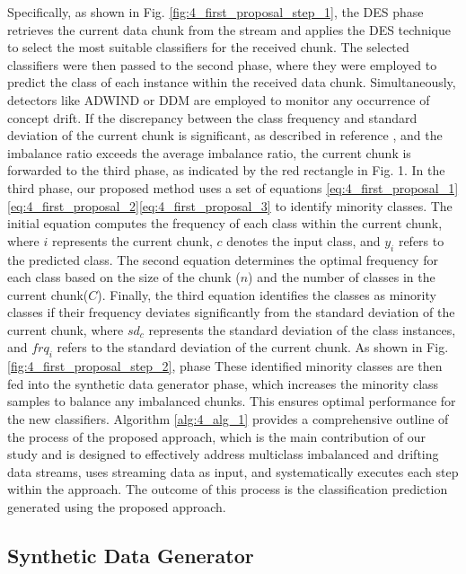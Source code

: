 Specifically, as shown in Fig. \ref{fig:4_first_proposal_step_1}, the DES phase retrieves the current data chunk from the stream and applies the DES technique to select the most suitable classifiers for the received chunk. The selected classifiers were then passed to the second phase, where they were employed to predict the class of each instance within the received data chunk. Simultaneously, detectors like ADWIND or DDM are employed to monitor any occurrence of concept drift. If the discrepancy between the class frequency and standard deviation of the current chunk is significant, as described in reference \cite{gama2004learning}, and the imbalance ratio exceeds the average imbalance ratio, the current chunk is forwarded to the third phase, as indicated by the red rectangle in Fig. 1. In the third phase, our proposed method uses a set of equations \ref{eq:4_first_proposal_1}\ref{eq:4_first_proposal_2}\ref{eq:4_first_proposal_3}
to identify minority classes. The initial equation computes the frequency of each class within the current chunk, where $i$ represents the current chunk, $c$ denotes the input class, and $y_i$ refers to the predicted class. The second equation determines the optimal frequency for each class based on the size of the chunk ($n$) and the number of classes in the current chunk($C$). Finally, the third equation identifies the classes as minority classes if their frequency deviates significantly from the standard deviation of the current chunk, where $sd_c$ represents the standard deviation of the class instances, and $frq_i$ refers to the standard deviation of the current chunk.
As shown in Fig. \ref{fig:4_first_proposal_step_2}, phase These identified minority classes are then fed into the synthetic data generator phase, which increases the minority class samples to balance any imbalanced chunks. This ensures optimal performance for the new classifiers. Algorithm  \ref{alg:4_alg_1} provides a comprehensive outline of the process of the proposed approach, which is the main contribution of our study and is designed to effectively address multiclass imbalanced and drifting data streams, uses streaming data as input, and systematically executes each step within the approach. The outcome of this process is the classification prediction generated using the proposed approach.


\subsection{Synthetic Data Generator}

